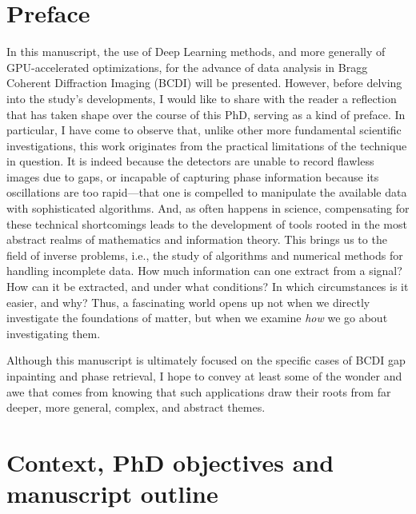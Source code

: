 \section{Preface}\label{chp:intro}

In this manuscript, the use of Deep Learning methods, and more generally of GPU-accelerated optimizations, for the advance of 
data analysis in Bragg Coherent Diffraction Imaging (BCDI) will be presented. However, before delving into the 
study's developments, I would like to share with the reader a reflection that has taken shape over the course of this 
PhD, serving as a kind of preface. In particular, I have come to observe that, unlike other more fundamental 
scientific investigations, this work originates from the practical limitations of the technique in question. 
It is indeed because the detectors are unable to record flawless images due to gaps, or incapable of 
capturing phase information because its oscillations are too rapid—that one is compelled to manipulate the available 
data with sophisticated algorithms. And, as often happens in science, compensating for these technical shortcomings 
leads to the development of tools rooted in the most abstract realms of mathematics and information theory. This brings 
us to the field of inverse problems, i.e., the study of algorithms and numerical methods for handling incomplete data. 
How much information can one extract from a signal? How can it be extracted, and under what conditions? In which 
circumstances is it easier, and why? Thus, a fascinating world opens up not when we directly investigate the foundations 
of matter, but when we examine \textit{how} we go about investigating them. 

Although this manuscript is ultimately focused on the specific cases of BCDI gap inpainting and phase retrieval, 
I hope to convey at least some of the wonder and awe that comes from knowing that such applications draw their roots 
from far deeper, more general, complex, and abstract themes.

\section{Context, PhD objectives and manuscript outline}

